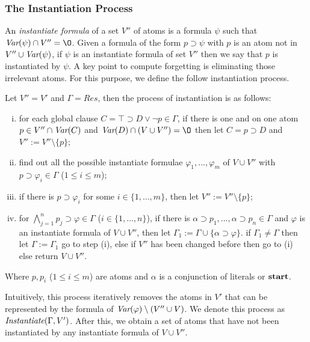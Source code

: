 \documentclass{article}
\begin{document}
\subsubsection{The Instantiation Process}
An \emph{instantiate formula} of a set $V''$ of atoms is a formula $\psi$ such that $\Var(\psi) \cap V'' ={\O}$.
Given a formula of the form $p \supset \psi$ with $p$ is an atom not in $V'' \cup \textit{Var}(\psi)$, if $\psi$ is an instantiate formula of set $V''$ then we say that $p$ is instantiated by $\psi$.
A key point to compute forgetting is eliminating those irrelevant atoms. For this purpose, we define the follow instantiation process.
\begin{definition}[Instantiation]\label{def:subst}
 Let $V''=V'$ and $\Gamma=Res$, then the process of instantiation is as follows:
\begin{enumerate}[(i)]
  \item for each global clause $C= \top \supset D \vee \neg p \in \Gamma$, if there is one and on one atom $p \in V''\cap \textit{Var}(C)$  and $\Var(D) \cap (V \cup V'')= {\O}$ then let $C = p \supset D$ and $V'':=V''\setminus \{p\}$;
  \item find out all the possible instantiate formulae $\varphi_1, ..., \varphi_m$ of $V \cup V''$ with $p\supset \varphi_i \in \Gamma$ ($1\leq i\leq m$);
  \item if there is $p\supset \varphi_i$ for some $i\in \{1,\dots, m\}$, then let $V'':=V''\setminus \{p\}$; %
  \item for $\bigwedge_{j=1}^n p_j \supset \varphi \in \Gamma$ ($i\in \{1,\dots, n\}$), if there is $\alpha \supset p_1,\dots, \alpha \supset p_n \in \Gamma$ and $\varphi$ is an instantiate formula of $V \cup V''$, then let $\Gamma_1 := \Gamma \cup \{\alpha \supset \varphi\}$. if $\Gamma_1\neq \Gamma$ then let $\Gamma:=\Gamma_1$ go to step (i), else if $V''$ has been changed before then go to (i) else return $V \cup V''$.
\end{enumerate}
Where $p, p_i$ ($1 \leq i\leq m$) are atoms and $\alpha$ is a conjunction of literals or $\textbf{start}$.
\end{definition}

Intuitively, this process iteratively removes the atoms in $V'$ that can be represented by the formula of $\textit{Var}(\varphi) \setminus (V'' \cup V)$.
We denote this process as $\emph{Instantiate}(\Gamma, V')$. %
 After this, we obtain a set of atoms that have not been instantiated by any instantiate formula of $V\cup V''$.
\end{document}
